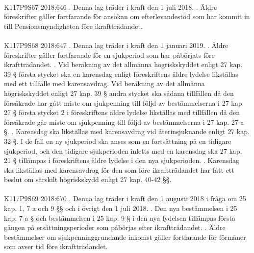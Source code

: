 \documentclass[a4paper,notitlepage,openany,10pt]{book}
\begin{document}
\paragraph*{}
{\tiny K117P9S67}
2018:646
. Denna lag träder i kraft den 1 juli 2018.
. Äldre föreskrifter gäller fortfarande för ansökan om efterlevandestöd som har kommit in till Pensionsmyndigheten före ikraftträdandet.
\paragraph*{}
{\tiny K117P9S68}
2018:647
. Denna lag träder i kraft den 1 januari 2019.
. Äldre föreskrifter gäller fortfarande för en sjukperiod som har påbörjats före ikraftträdandet.
. Vid beräkning av det allmänna högriskskyddet enligt 27 kap. 39 § första stycket ska en karensdag enligt föreskriftens äldre lydelse likställas med ett tillfälle med karensavdrag. Vid beräkning av det allmänna högriskskyddet enligt 27 kap. 39 § andra stycket ska sådana tillfällen då den försäkrade har gått miste om sjukpenning till följd av bestämmelserna i 27 kap. 27 § första stycket 2 i föreskriftens äldre lydelse likställas med tillfällen då den försäkrade går miste om sjukpenning till följd av bestämmelserna i 27 kap. 27 a §.
. Karensdag ska likställas med karensavdrag vid återinsjuknande enligt 27 kap. 32 §. I de fall en ny sjukperiod ska anses som en fortsättning på en tidigare sjukperiod, och den tidigare sjukperioden inletts med en karensdag ska 27 kap. 21 § tillämpas i föreskriftens äldre lydelse i den nya sjukperioden.
. Karensdag ska likställas med karensavdrag för den som före ikraftträdandet har fått ett beslut om särskilt högriskskydd enligt 27 kap. 40-42 §§.
\paragraph*{}
{\tiny K117P9S69}
2018:670
. Denna lag träder i kraft den 1 augusti 2018 i fråga om 25 kap. 1, 7 a och 9 §§ och i övrigt den 1 juli 2018.
. Den nya bestämmelsen i 25 kap. 7 a § och bestämmelsen i 25 kap. 9 § i den nya lydelsen tillämpas första gången på ersättningsperioder som påbörjas efter ikraftträdandet.
. Äldre bestämmelser om sjukpenninggrundande inkomst gäller fortfarande för förmåner som avser tid före ikraftträdandet.
\end{document}
